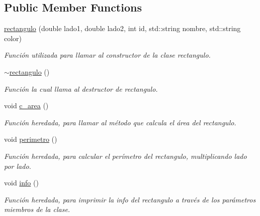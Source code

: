 \subsection*{Public Member Functions}
\begin{DoxyCompactItemize}
\item 
\hyperlink{classrectangulo_a0c066e0bfe8a56afe61d0b913864801c}{rectangulo} (double lado1, double lado2, int id, std\+::string nombre, std\+::string color)
\begin{DoxyCompactList}\small\item\em Función utilizada para llamar al constructor de la clase rectangulo. \end{DoxyCompactList}\item 
\mbox{\label{classrectangulo_aba192e636fe037aaf0ccc294e4570b29}} 
\hyperlink{classrectangulo_aba192e636fe037aaf0ccc294e4570b29}{$\sim$rectangulo} ()
\begin{DoxyCompactList}\small\item\em Función la cual llama al destructor de rectangulo. \end{DoxyCompactList}\item 
\mbox{\label{classrectangulo_a63ca5b15d7722d64280d94a7edc3ce65}} 
void \hyperlink{classrectangulo_a63ca5b15d7722d64280d94a7edc3ce65}{c\+\_\+area} ()
\begin{DoxyCompactList}\small\item\em Función heredada, para llamar al método que calcula el área del rectangulo. \end{DoxyCompactList}\item 
\mbox{\label{classrectangulo_a493f8a9ea115164d439b6fd1d52a042d}} 
void \hyperlink{classrectangulo_a493f8a9ea115164d439b6fd1d52a042d}{perimetro} ()
\begin{DoxyCompactList}\small\item\em Función heredada, para calcular el perímetro del rectangulo, multiplicando lado por lado. \end{DoxyCompactList}\item 
\mbox{\label{classrectangulo_a0e632825c3e80d738625119454f1b9ce}} 
void \hyperlink{classrectangulo_a0e632825c3e80d738625119454f1b9ce}{info} ()
\begin{DoxyCompactList}\small\item\em Función heredada, para imprimir la info del rectangulo a través de los parámetros miembros de la clase. \end{DoxyCompactList}\item 

\end{DoxyCompactItemize}
